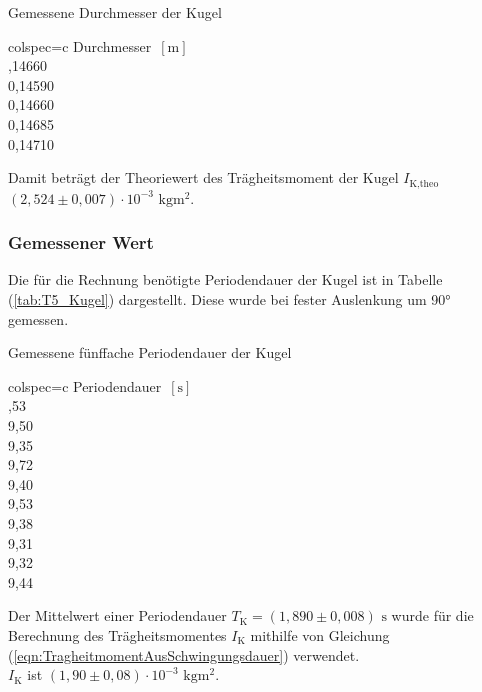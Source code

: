     \begin{table}[H]
      \centering 
      \caption{Gemessene Durchmesser der Kugel}
      \label{tab:Durchmesser_Kugel}
      \begin{tblr}{colspec={c}}
          \toprule
          Durchmesser $\,[\unit{\meter}]$ \\
          ,14660 \\
          0,14590 \\
          0,14660 \\
          0,14685 \\
          0,14710 \\
          \bottomrule
      \end{tblr}
    \end{table}
    Damit beträgt der Theoriewert des Trägheitsmoment der Kugel $I_{\text{K,theo}}$ $(2,524 \pm 0,007) \cdot 10^{-3} \,\,\unit{\kilo\gram\meter\squared}$.

    \subsubsection{Gemessener Wert}
    Die für die Rechnung benötigte Periodendauer der Kugel ist in Tabelle (\ref{tab:T5_Kugel}) dargestellt. 
    Diese wurde bei fester Auslenkung um 90° gemessen.
    \begin{table}[H]
      \centering 
      \caption{Gemessene fünffache Periodendauer der Kugel}
      \label{tab:T5_Kugel}
      \begin{tblr}{colspec={c}}
          \toprule
          Periodendauer $\,[\unit{\second}]$ \\
          ,53 \\
          9,50 \\
          9,35 \\
          9,72 \\
          9,40 \\
          9,53 \\
          9,38 \\
          9,31 \\
          9,32 \\
          9,44 \\
          \bottomrule
      \end{tblr}
    \end{table}
    Der Mittelwert einer Periodendauer $T_{\text{K}} = (1,890 \pm 0,008) \,\,\unit{\second}$ wurde für die Berechnung des 
    Trägheitsmomentes $I_{\text{K}}$ mithilfe von Gleichung (\ref{eqn:TragheitmomentAusSchwingungsdauer}) verwendet. \\
    $I_{\text{K}}$ ist $(1,90 \pm 0,08) \cdot 10^{-3} \,\,\unit{\kilo\gram\meter\squared}$.

